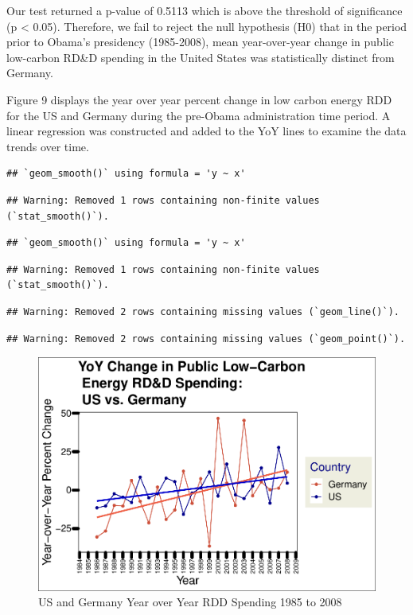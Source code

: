 \documentclass[
  12pt,
]{article}
\begin{document}
Our test returned a p-value of 0.5113 which is above the threshold of
significance (p \textless{} 0.05). Therefore, we fail to reject the null
hypothesis (H0) that in the period prior to Obama's presidency
(1985-2008), mean year-over-year change in public low-carbon RD\&D
spending in the United States was statistically distinct from Germany.

Figure 9 displays the year over year percent change in low carbon energy
RDD for the US and Germany during the pre-Obama administration time
period. A linear regression was constructed and added to the YoY lines
to examine the data trends over time. \newpage

\begin{verbatim}
## `geom_smooth()` using formula = 'y ~ x'
\end{verbatim}

\begin{verbatim}
## Warning: Removed 1 rows containing non-finite values (`stat_smooth()`).
\end{verbatim}

\begin{verbatim}
## `geom_smooth()` using formula = 'y ~ x'
\end{verbatim}

\begin{verbatim}
## Warning: Removed 1 rows containing non-finite values (`stat_smooth()`).
\end{verbatim}

\begin{verbatim}
## Warning: Removed 2 rows containing missing values (`geom_line()`).
\end{verbatim}

\begin{verbatim}
## Warning: Removed 2 rows containing missing values (`geom_point()`).
\end{verbatim}

\begin{figure}
\centering
\includegraphics{Chang_Jenkins_Mullens_ENV872_Final_files/figure-latex/visualizing the pre US and Germany data together-1.pdf}
\caption{US and Germany Year over Year RDD Spending 1985 to 2008}
\end{figure}
\end{document}
